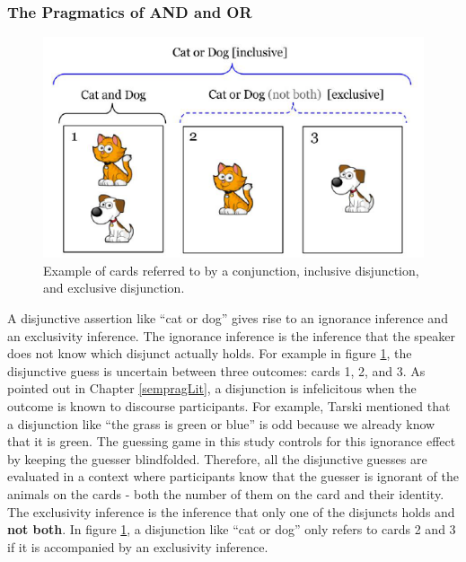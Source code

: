 \documentclass[oneside]{report}
\theoremstyle{definition}
\theoremstyle{definition}
\theoremstyle{definition}
\theoremstyle{remark}
\begin{document}
\subsubsection{The Pragmatics of AND and OR}\label{implicature}
\begin{figure}[t]

{\centering \includegraphics{figs/exclusivity-1} 

}

\caption{Example of cards referred to by a conjunction, inclusive disjunction, and exclusive disjunction.}\label{fig:exclusivity}
\end{figure}
A disjunctive assertion like ``cat or dog'' gives rise to an ignorance
inference and an exclusivity inference. The ignorance inference is the
inference that the speaker does not know which disjunct actually holds.
For example in figure \ref{fig:exclusivity}, the disjunctive guess is
uncertain between three outcomes: cards 1, 2, and 3. As pointed out in
Chapter \ref{sempragLit}, a disjunction is infelicitous when the outcome
is known to discourse participants. For example, Tarski mentioned that a
disjunction like ``the grass is green or blue'' is odd because we
already know that it is green. The guessing game in this study controls
for this ignorance effect by keeping the guesser blindfolded. Therefore,
all the disjunctive guesses are evaluated in a context where
participants know that the guesser is ignorant of the animals on the
cards - both the number of them on the card and their identity. The
exclusivity inference is the inference that only one of the disjuncts
holds and \textbf{not both}. In figure \ref{fig:exclusivity}, a
disjunction like ``cat or dog'' only refers to cards 2 and 3 if it is
accompanied by an exclusivity inference.
\end{document}
